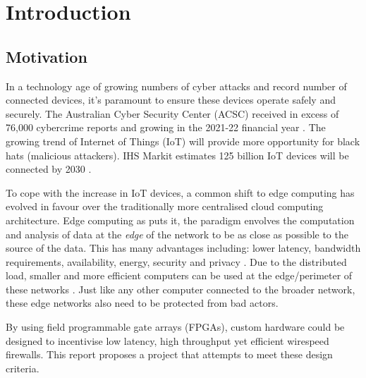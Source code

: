 \chapter[Introduction]{Introduction}
\label{Chap:Intro}



\section{Motivation }


In a technology age of growing numbers of cyber attacks and record number of connected devices, it's 
paramount to ensure these devices operate safely and securely. The Australian Cyber Security Center (ACSC) received in 
excess of 76,000 cybercrime reports and growing in the 2021-22 financial year \cite{acsc_2022}. The growing trend of Internet of Things (IoT) will provide 
more opportunity for black hats (malicious attackers). IHS Markit estimates 125 billion IoT devices will be connected by 2030 \cite{IHS_iot}. 

To cope with the increase in IoT devices, a common shift to edge computing has evolved in favour over the traditionally more centralised cloud computing 
architecture. Edge computing as \cite{EdgeComputing} puts it, the paradigm envolves the computation and analysis of data 
at the \textit{edge} of the network to be as close as possible to the source of the data. This has many advantages including: lower latency, bandwidth requirements,
availability, energy, security and privacy \cite{EdgeComputing}. Due to the distributed load, smaller and more efficient computers can be used 
at the edge/perimeter of these networks \cite{EdgeComputingPerspectives}. Just like any other computer connected to the broader network, these 
edge networks also need to be protected from bad actors.


By using field programmable gate arrays (FPGAs), custom hardware could be designed to incentivise low latency, high throughput yet efficient wirespeed firewalls. 
This report proposes a project that attempts to meet these design criteria. 


